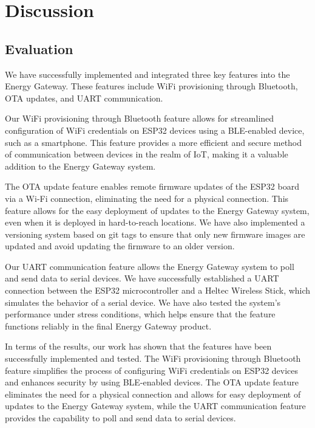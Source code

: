 \section{Discussion}
\label{sec:discussion}

\subsection{Evaluation}
\label{sec:evaluation}

We have successfully implemented and integrated three key features into the Energy Gateway. These features include WiFi provisioning through Bluetooth, OTA updates, and UART communication.

Our WiFi provisioning through Bluetooth feature allows for streamlined configuration of WiFi credentials on ESP32 devices using a BLE-enabled device, such as a smartphone. This feature provides a more efficient and secure method of communication between devices in the realm of IoT, making it a valuable addition to the Energy Gateway system.

The OTA update feature enables remote firmware updates of the ESP32 board via a Wi-Fi connection, eliminating the need for a physical connection. This feature allows for the easy deployment of updates to the Energy Gateway system, even when it is deployed in hard-to-reach locations. We have also implemented a versioning system based on git tags to ensure that only new firmware images are updated and avoid updating the firmware to an older version.

Our UART communication feature allows the Energy Gateway system to poll and send data to serial devices. We have successfully established a UART connection between the ESP32 microcontroller and a Heltec Wireless Stick, which simulates the behavior of a serial device. We have also tested the system's performance under stress conditions, which helps ensure that the feature functions reliably in the final Energy Gateway product.

In terms of the results, our work has shown that the features have been successfully implemented and tested. The WiFi provisioning through Bluetooth feature simplifies the process of configuring WiFi credentials on ESP32 devices and enhances security by using BLE-enabled devices. The OTA update feature eliminates the need for a physical connection and allows for easy deployment of updates to the Energy Gateway system, while the UART communication feature provides the capability to poll and send data to serial devices.

